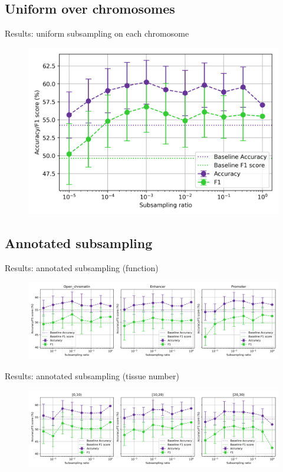 \documentclass[aspectratio=169]{beamer}
\begin{document}
\subsection{Uniform over chromosomes}
\begin{frame}{Results: uniform subsampling on each chromosome}
\begin{figure}[H]
    \centering
    \includegraphics[height=0.5\textwidth]{../figures/uniform_sample_low_ratio.png}
    \label{fig:res1b}
\end{figure}
\end{frame}

\subsection{Annotated subsampling}
\begin{frame}{Results: annotated subsampling (function)}
\begin{figure}[H]
    \centering
    \includegraphics[width=\textwidth]{../figures/subsample_annotated.png}
    \label{fig:res2a}
\end{figure}
\end{frame}

\begin{frame}{Results: annotated subsampling (tissue number)}
\begin{figure}[H]
    \centering
    \includegraphics[width=\textwidth]{../figures/subsample_ntissue.png}
    \label{fig:res2b}
\end{figure}
\end{frame}
\end{document}
